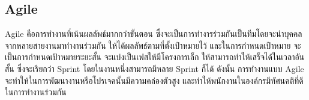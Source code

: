 \documentclass[12pt,oneside,openright,a4paper]{cpe-thai-project}
\begin{document}
\subsection{Agile}
\hspace*{1cm} Agile \cite{WhaiIsAgile} คือการทำงานที่เน้นผลลัพธ์มากกว่าขั้นตอน ซึ่งจะเป็นการทำงารร่วมกันเป็นทีมโดยจะนำบุคคลจากหลายสายงานมาทำงานร่วมกัน ให้ได้ผลลัพธ์ตามที่ตั้งเป้าหมายไว้ และในการกำหนดเป้าหมาย จะเป็นการกำหนดเป้าหมายระยะสั้น จะแบ่งเป็นเฟสให้มีโครงการเล็ก ให้สามารถทำให้เสร็จได้ในเวลาอันสั้น ซึ่งจะเรียกว่า Sprint โดยในงานหนึ่งสามารถมีหลาย Sprint ก็ได้ ดังนั้น การทำงานแบบ Agile จะทำให้ในการพัฒนางานหรือโปรเจคนั้นมีความคล่องตัวสูง และทำให้พนักงานในองค์กรมีทัศนคติที่ดีในการทำงานร่วมกัน


\end{document}

